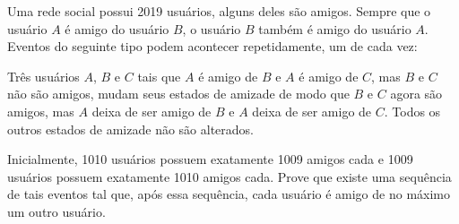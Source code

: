 Uma rede social possui 2019 usuários, alguns deles são amigos.
Sempre que o usuário $A$ é amigo do usuário $B$, o usuário $B$ também é amigo do usuário $A$.
Eventos do seguinte tipo podem acontecer repetidamente, um de cada vez:

Três usuários $A$, $B$ e $C$ tais que $A$ é amigo de $B$ e $A$ é amigo de $C$, mas $B$ e $C$ não são amigos, mudam seus estados de amizade de modo que $B$ e $C$ agora são amigos, mas $A$ deixa de ser amigo de $B$ e $A$ deixa de ser amigo de $C$.
Todos os outros estados de amizade não são alterados.

Inicialmente, 1010 usuários possuem exatamente 1009 amigos cada e 1009 usuários possuem exatamente 1010 amigos cada.
Prove que existe uma sequência de tais eventos tal que, após essa sequência, cada usuário é amigo de no máximo um outro usuário.